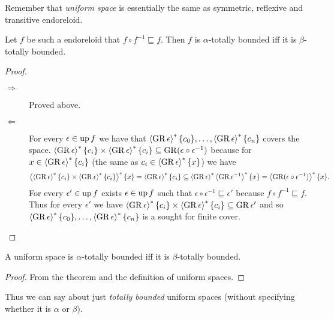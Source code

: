 Remember that \emph{uniform space} is essentially the same as symmetric,
reflexive and transitive endoreloid.
\begin{thm}
Let $f$ be such a endoreloid that $f\circ f^{-1}\sqsubseteq f$.
Then $f$ is $\alpha$-totally bounded iff it is $\beta$-totally
bounded.\end{thm}
\begin{proof}
~
\begin{description}
\item [{$\Rightarrow$}] Proved above.
\item [{$\Leftarrow$}] For every $\epsilon\in\operatorname{up} f$ we have that $\left\langle \operatorname{GR}\epsilon\right\rangle ^{\ast}\{c_{0}\},\dots,\left\langle \operatorname{GR}\epsilon\right\rangle ^{\ast}\{c_{n}\}$
covers the space. $\left\langle \operatorname{GR}\epsilon\right\rangle ^{\ast}\{c_{i}\}\times\left\langle \operatorname{GR}\epsilon\right\rangle ^{\ast}\{c_{i}\}\subseteq\operatorname{GR}(\epsilon\circ\epsilon^{-1})$
because for $x\in\left\langle \operatorname{GR}\epsilon\right\rangle ^{\ast}\{c_{i}\}$ (the same as $c_{i}\in\left\langle \operatorname{GR}\epsilon\right\rangle ^{\ast}\{x\}$)
we have 
\[
\left\langle \left\langle \operatorname{GR}\epsilon\right\rangle ^{\ast}\{c_{i}\}\times\left\langle \operatorname{GR}\epsilon\right\rangle ^{\ast}\{c_{i}\}\right\rangle ^{\ast}\{x\}=\left\langle \operatorname{GR}\epsilon\right\rangle ^{\ast}\{c_{i}\}\subseteq\left\langle \operatorname{GR}\epsilon\right\rangle ^{\ast}\left\langle \operatorname{GR}\epsilon^{-1}\right\rangle ^{\ast}\{x\}=\left\langle \operatorname{GR}(\epsilon\circ\epsilon^{-1})\right\rangle ^{\ast}\{x\}.
\]
For every $\epsilon'\in\operatorname{up} f$ exists $\epsilon\in\operatorname{up} f$ such that
$\epsilon\circ\epsilon^{-1}\sqsubseteq\epsilon'$ because $f\circ f^{-1}\sqsubseteq f$.
Thus for every $\epsilon'$ we have $\left\langle \operatorname{GR}\epsilon\right\rangle ^{\ast}\{c_{i}\}\times\left\langle \operatorname{GR}\epsilon\right\rangle ^{\ast}\{c_{i}\}\subseteq\operatorname{GR}\epsilon'$
and so $\left\langle \operatorname{GR}\epsilon\right\rangle ^{\ast}\{c_{0}\},\dots,\left\langle \operatorname{GR}\epsilon\right\rangle ^{\ast}\{c_{n}\}$
is a sought for finite cover.
\end{description}
\end{proof}
\begin{cor}
A uniform space is $\alpha$-totally bounded iff it is $\beta$-totally
bounded.\end{cor}
\begin{proof}
From the theorem and the definition of uniform spaces.
\end{proof}
Thus we can say about just \emph{totally bounded} uniform spaces (without
specifying whether it is $\alpha$ or $\beta$).


